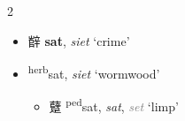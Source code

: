 \begin{multicols}{2}
\begin{itemize}





\end{itemize}


\begin{minipage}{\columnwidth}
\begin{itemize}[leftmargin=*, labelsep=0.5em]     \item {\Large{辥}} %
    {\large{\textbf{sat}}},
    \textit{siet} `crime' %

  \item {\Large{}} %
    {\large{{\textsuperscript{herb}}sat}},
    \textit{siet} `wormwood' %
\begin{itemize}
  \item {\Large{躠}} %
    {\large{{\textsuperscript{ped}}sat}},
    \textit{sat}, \textcolor{gray}{\textit{set}} `limp' %




\end{itemize}
\end{itemize}
\end{minipage}
\end{multicols}

